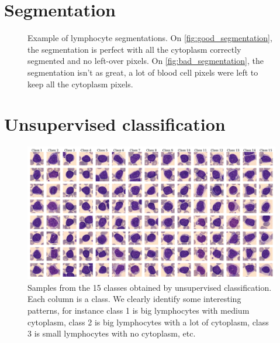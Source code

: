 \documentclass{midl}
\begin{document}
\section{Segmentation}

\begin{figure}[H]
    \centering
    {
         \qquad
    }
    {\caption{Example of lymphocyte segmentations. On \ref{fig:good_segmentation}, the segmentation is perfect with all the cytoplasm correctly segmented and no left-over pixels. On \ref{fig:bad_segmentation}, the segmentation isn't as great, a lot of blood cell pixels were left to keep all the cytoplasm pixels.\label{fig:segmentation}}}
\end{figure}

\section{Unsupervised classification}

\begin{figure}[H]
    \centering
    \includegraphics[width=\textwidth]{figures/unsupervised_classification.png}
    \caption{Samples from the 15 classes obtained by unsupervised classification. Each column is a class. We clearly identify some interesting patterns, for instance class 1 is big lymphocytes with medium cytoplasm, class 2 is big lymphocytes with a lot of cytoplasm, class 3 is small lymphocytes with no cytoplasm, etc.}
    \label{fig:unsupervised_classification}
\end{figure}
\end{document}
